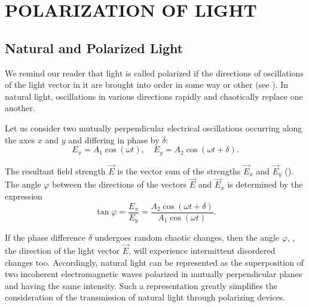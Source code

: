

\chapter[POLARIZATION OF LIGHT]{POLARIZATION OF LIGHT}\label{chap:19}

\section{Natural and Polarized Light}\label{sec:19_1}

We remind our reader that light is called polarized if the directions of oscillations of the light vector in it are brought into order in some way or other (see ).
In natural light, oscillations in various directions rapidly and chaotically replace one another.

Let us consider two mutually perpendicular electrical oscillations occurring along the axes $x$ and $y$ and differing in phase by $\delta$:
\begin{equation}\label{eq:19_1}
	E_x = A_1 \cos(\omega t),\quad E_y = A_2 \cos(\omega t + \delta).
\end{equation}

The resultant field strength $\vec{E}$ is the vector sum of the strengths $\vec{E}_x$ and $\vec{E}_y$ ().
The angle $\varphi$ between the directions of the vectors $\vec{E}$ and $\vec{E}_x$ is determined by the expression
\begin{equation}\label{eq:19_2}
	\tan\varphi = \frac{E_x}{E_y} = \frac{A_2 \cos(\omega t + \delta)}{A_1 \cos(\omega t)}.
\end{equation}

If the phase difference $\delta$ undergoes random chaotic changes, then the angle $\varphi$, \ie, the
direction of the light vector $\vec{E}$, will experience intermittent disordered changes too.
Accordingly, natural light can be represented as the superposition of two incoherent electromagnetic waves polarized in mutually perpendicular planes and having the same intensity.
Such a representation greatly simplifies the consideration of the transmission of natural light through polarizing devices.

